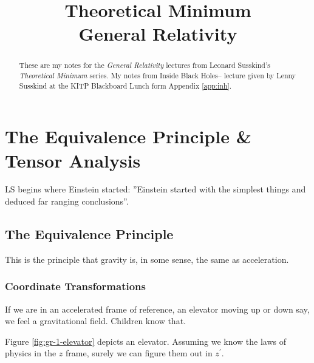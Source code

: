 \documentclass[]{article}
\title{Theoretical Minimum\\General Relativity}
\author{}
\begin{document}
\maketitle

\begin{abstract}
	These are my notes for the \emph{General Relativity}\cite{susskind2012general} lectures from Leonard Susskind's \emph{Theoretical Minimum} series\cite{susskind2007theoretical}. My notes from Inside Black Holes-- lecture given by Lenny Susskind at the KITP Blackboard Lunch\cite{susskind2013inside} form Appendix \ref{app:inh}.
	
\end{abstract}

\tableofcontents
\listoffigures
\listoftables
\listoftheorems

\section{The Equivalence Principle \& Tensor Analysis}

LS begins where Einstein started: ''Einstein started with the simplest things and deduced far ranging conclusions''.

\subsection{The Equivalence Principle}

This is the principle that gravity is, in some sense, the same as acceleration.

\subsubsection{Coordinate Transformations}

If we are in an accelerated frame of reference, an elevator moving up or down say, we feel a gravitational field. Children know that.

Figure \ref{fig:gr-1-elevator} depicts an elevator. Assuming we know the laws of physics in the $z$ frame, surely we can figure them out in $z^\prime$.
\end{document}
